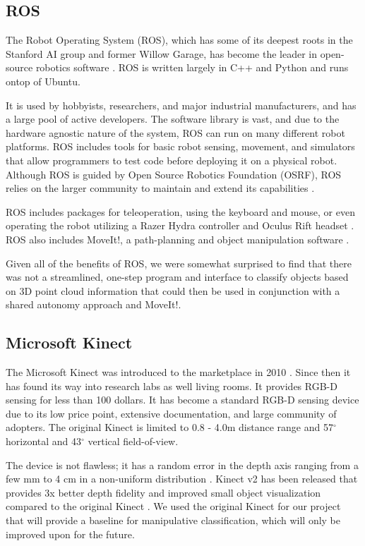 \documentclass{article}
\begin{document}
\subsection{ROS}
The Robot Operating System (ROS), which has some of its deepest roots in the Stanford AI group and former Willow Garage, 
has become the leader in open-source robotics software \cite{ros, rospaper}. ROS is written largely in C++ and Python and runs ontop of Ubuntu.  

It is used by hobbyists, researchers, and major industrial manufacturers, and has a large pool of active developers. The software library is vast, and due to the hardware agnostic nature of the system, ROS can run on many different robot platforms.  ROS includes tools for basic robot sensing, movement, and simulators that allow programmers to test code before deploying it on a physical robot. Although ROS is guided by Open Source Robotics Foundation (OSRF), ROS relies on the larger community to maintain and extend its capabilities \cite{ros, OSRF}.

ROS includes packages for teleoperation, using the keyboard and mouse, or even operating the robot utilizing a Razer Hydra controller and Oculus Rift headset \cite{surrogate}. ROS also includes MoveIt!, a path-planning and object manipulation software \cite{moveit}. 

Given all of the benefits of ROS, we were somewhat surprised to find that there was not a streamlined, one-step program and interface to classify objects based on 3D point cloud information that could then be used in conjunction with a shared autonomy approach and MoveIt!.

\subsection{Microsoft Kinect}
The Microsoft Kinect was introduced to the marketplace in 2010 \cite{kinectHistory}. Since then 
it has found its way into research labs as well living rooms.
It provides RGB-D sensing for less than 100 dollars. It has become a standard RGB-D
sensing device due to its low price point, extensive documentation, and large community of
adopters. The original Kinect is limited to 0.8 - 4.0m distance range and 57$^{\circ}$ horizontal 
and 43$^{\circ}$ vertical field-of-view. 

The device is not flawless; it has a random error in the depth axis 
ranging from a few mm to 4 cm in a non-uniform distribution \cite{khoshelham2012accuracy,nguyen2012modeling}.
Kinect v2 has been released that provides 3x better depth fidelity and improved small object visualization compared to 
the original Kinect \cite{kinect}. We used the original Kinect for our project that will provide a baseline for manipulative classification, which will only be improved upon for the future.
\end{document}
